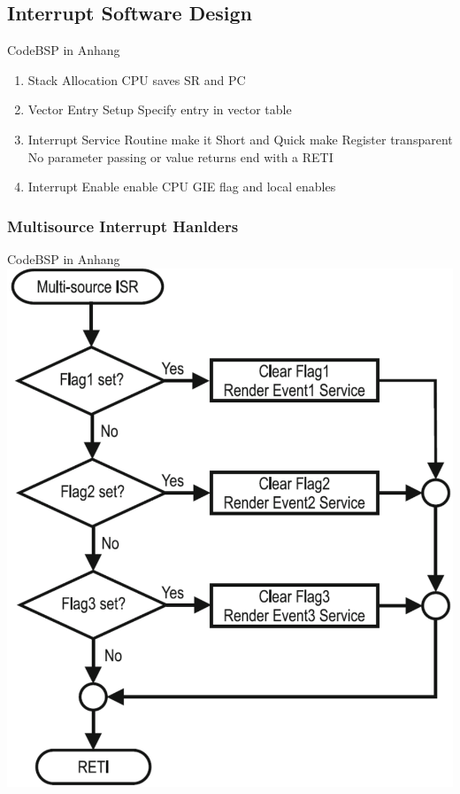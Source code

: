 \begin{minipage}{0.5\linewidth}
\subsection{Interrupt Software Design }
    CodeBSP in Anhang \label{InterruptC}
    \begin{enumerate}
        \item Stack Allocation\newline
            CPU saves SR and PC
        \item Vector Entry Setup\newline
            Specify entry in vector table 
        \item Interrupt Service Routine\newline
            make it Short and Quick\newline
            make Register transparent \newline
            No parameter passing or value returns\newline
            end with a RETI
        \item Interrupt Enable\newline
            enable CPU GIE flag and local enables
    \end{enumerate}
\end{minipage}
\begin{minipage}{0.5\linewidth}
\subsubsection{Multisource Interrupt Hanlders }
CodeBSP in Anhang \label{MultiInterruptC}\newline
\includegraphics[width=0.6\linewidth]{images/MultiSourceISR}
\end{minipage}

